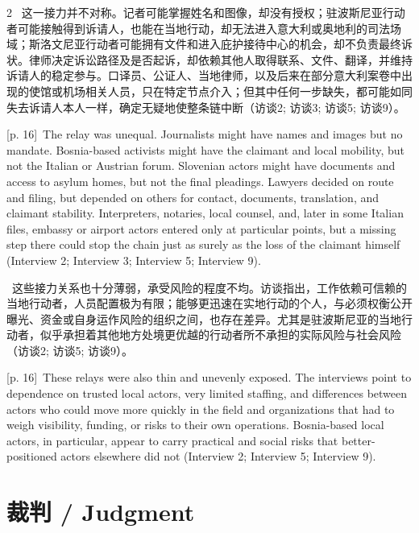 \documentclass[10pt,a4paper]{article}
\begin{document}
\begin{paracol}{2}
\switchcolumn*
{\scriptsize\color{gray} [p. 16]}\ 这一接力并不对称。记者可能掌握姓名和图像，却没有授权；驻波斯尼亚行动者可能接触得到诉请人，也能在当地行动，却无法进入意大利或奥地利的司法场域；斯洛文尼亚行动者可能拥有文件和进入庇护接待中心的机会，却不负责最终诉状。律师决定诉讼路径及是否起诉，却依赖其他人取得联系、文件、翻译，并维持诉请人的稳定参与。口译员、公证人、当地律师，以及后来在部分意大利案卷中出现的使馆或机场相关人员，只在特定节点介入；但其中任何一步缺失，都可能如同失去诉请人本人一样，确定无疑地使整条链中断（访谈2; 访谈3; 访谈5; 访谈9）。\par
\switchcolumn
{\scriptsize\color{gray} [p. 16]}\ The relay was unequal. Journalists might have names and images but no mandate. Bosnia-based activists might have the claimant and local mobility, but not the Italian or Austrian forum. Slovenian actors might have documents and access to asylum homes, but not the final pleadings. Lawyers decided on route and filing, but depended on others for contact, documents, translation, and claimant stability. Interpreters, notaries, local counsel, and, later in some Italian files, embassy or airport actors entered only at particular points, but a missing step there could stop the chain just as surely as the loss of the claimant himself (Interview 2; Interview 3; Interview 5; Interview 9).\par
\switchcolumn*
{\scriptsize\color{gray} [p. 16]}\ 这些接力关系也十分薄弱，承受风险的程度不均。访谈指出，工作依赖可信赖的当地行动者，人员配置极为有限；能够更迅速在实地行动的个人，与必须权衡公开曝光、资金或自身运作风险的组织之间，也存在差异。尤其是驻波斯尼亚的当地行动者，似乎承担着其他地方处境更优越的行动者所不承担的实际风险与社会风险（访谈2; 访谈5; 访谈9）。\par
\switchcolumn
{\scriptsize\color{gray} [p. 16]}\ These relays were also thin and unevenly exposed. The interviews point to dependence on trusted local actors, very limited staffing, and differences between actors who could move more quickly in the field and organizations that had to weigh visibility, funding, or risks to their own operations. Bosnia-based local actors, in particular, appear to carry practical and social risks that better-positioned actors elsewhere did not (Interview 2; Interview 5; Interview 9).\par
\switchcolumn*
\end{paracol}
\section*{裁判 / Judgment}
\end{document}
